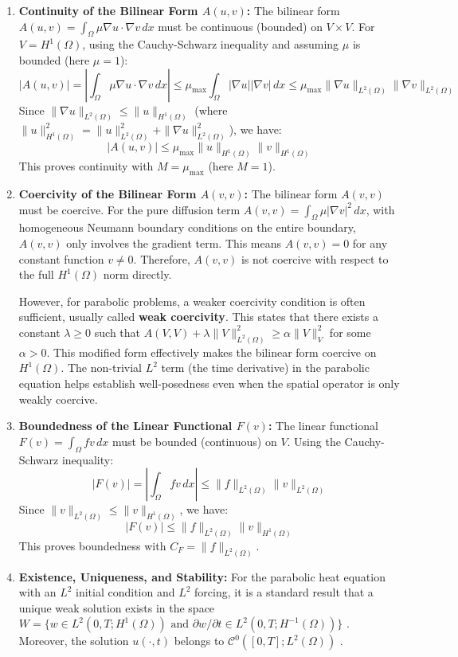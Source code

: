 \documentclass[
  11pt,
]{article}
\begin{document}
\begin{enumerate}
\def\labelenumi{\arabic{enumi}.}
\item
  \textbf{Continuity of the Bilinear Form $A(u,v)$:} The bilinear form
  $A(u,v) = \int_{\Omega} \mu \nabla u \cdot \nabla v \, dx$ must be
  continuous (bounded) on $V \times V$. For $V = H^1(\Omega)$, using
  the Cauchy-Schwarz inequality and assuming $\mu$ is bounded (here
  $\mu=1$): \[
  |A(u, v)| = \left| \int_{\Omega} \mu \nabla u \cdot \nabla v \, dx \right| \le \mu_{\max} \int_{\Omega} |\nabla u| |\nabla v| \, dx \le \mu_{\max} \|\nabla u\|_{L^2(\Omega)} \|\nabla v\|_{L^2(\Omega)}
  \] Since $\|\nabla u\|_{L^2(\Omega)} \le \|u\|_{H^1(\Omega)}$ (where
  $\|u\|_{H^1(\Omega)}^2 = \|u\|_{L^2(\Omega)}^2 + \|\nabla u\|_{L^2(\Omega)}^2$),
  we have: \[
  |A(u, v)| \le \mu_{\max} \|u\|_{H^1(\Omega)} \|v\|_{H^1(\Omega)}
  \] This proves continuity with $M = \mu_{\max}$ (here $M=1$).
\item
  \textbf{Coercivity of the Bilinear Form $A(v,v)$:} The bilinear form
  $A(v,v)$ must be coercive. For the pure diffusion term
  $A(v, v) = \int_{\Omega} \mu |\nabla v|^2 \, dx$, with homogeneous
  Neumann boundary conditions on the entire boundary, $A(v,v)$ only
  involves the gradient term. This means $A(v,v) = 0$ for any constant
  function $v \ne 0$. Therefore, $A(v,v)$ is not coercive with
  respect to the full $H^1(\Omega)$ norm directly.

  However, for parabolic problems, a weaker coercivity condition is
  often sufficient, usually called \textbf{weak coercivity}. This states
  that there exists a constant $\lambda \ge 0$ such that
  $A(V, V) + \lambda \|V\|_{L^2(\Omega)}^2 \ge \alpha \|V\|_V^2$ for
  some $\alpha > 0$. This modified form effectively makes the bilinear form coercive
  on $H^1(\Omega)$. The non-trivial $L^2$ term (the time derivative)
  in the parabolic equation helps establish well-posedness even when the
  spatial operator is only weakly coercive.
\item
  \textbf{Boundedness of the Linear Functional $F(v)$:} The linear
  functional $F(v) = \int_{\Omega} f v \, dx$ must be bounded
  (continuous) on $V$. Using the Cauchy-Schwarz inequality: \[
  |F(v)| = \left| \int_{\Omega} f v \, dx \right| \le \|f\|_{L^2(\Omega)} \|v\|_{L^2(\Omega)}
  \] Since $\|v\|_{L^2(\Omega)} \le \|v\|_{H^1(\Omega)}$, we have: \[
  |F(v)| \le \|f\|_{L^2(\Omega)} \|v\|_{H^1(\Omega)}
  \] This proves boundedness with $C_F = \|f\|_{L^2(\Omega)}$.
\item
  \textbf{Existence, Uniqueness, and Stability:} For the parabolic heat
  equation with an $L^2$ initial condition and $L^2$ forcing, it is
  a standard result that a unique weak solution exists in the space
  $W = \{w\in L^2(0,T;H^1(\Omega)) \text{ and } \partial w/\partial t\in L^2(0,T;H^{-1}(\Omega))\}$
  \cite{picasso1998, quarteroni_numerical_models}. Moreover, the solution $u(\cdot,t)$ belongs to
  $\mathcal{C}^0([0,T];L^2(\Omega))$ \cite{picasso1998}.


\end{enumerate}
\end{document}
